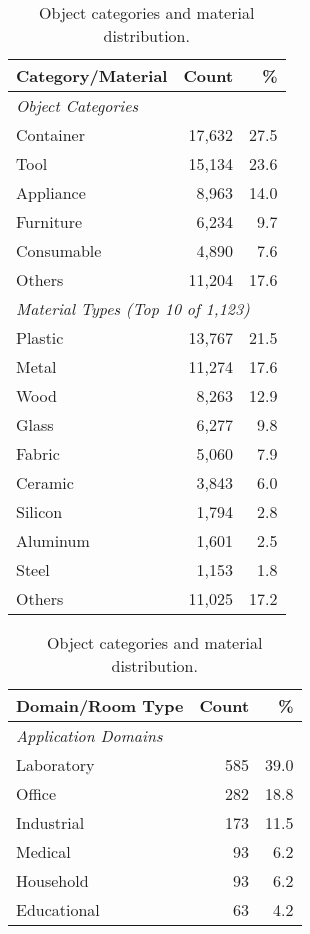 \vspace{0.3cm}

\begin{table}[htbp]
\centering
\footnotesize
\begin{minipage}[t]{0.47\textwidth}
\centering
\begin{tabular}{lrr}
\toprule
\textbf{Category/Material} & \textbf{Count} & \textbf{\%} \\
\midrule
\multicolumn{3}{l}{\textit{Object Categories}} \\
Container & 17,632 & 27.5 \\
Tool & 15,134 & 23.6 \\
Appliance & 8,963 & 14.0 \\
Furniture & 6,234 & 9.7 \\
Consumable & 4,890 & 7.6 \\
Others & 11,204 & 17.6 \\
\midrule
\multicolumn{3}{l}{\textit{Material Types (Top 10 of 1,123)}} \\
Plastic & 13,767 & 21.5 \\
Metal & 11,274 & 17.6 \\
Wood & 8,263 & 12.9 \\
Glass & 6,277 & 9.8 \\
Fabric & 5,060 & 7.9 \\
Ceramic & 3,843 & 6.0 \\
Silicon & 1,794 & 2.8 \\
Aluminum & 1,601 & 2.5 \\
Steel & 1,153 & 1.8 \\
Others & 11,025 & 17.2 \\
\bottomrule
\end{tabular}
\caption{Object categories and material distribution.}
\label{tab:object_materials}
\end{minipage}
\hfill
\begin{minipage}[t]{0.47\textwidth}
\centering
\begin{tabular}{lrr}
\toprule
\textbf{Domain/Room Type} & \textbf{Count} & \textbf{\%} \\
\midrule
\multicolumn{3}{l}{\textit{Application Domains}} \\
Laboratory & 585 & 39.0 \\
Office & 282 & 18.8 \\
Industrial & 173 & 11.5 \\
Medical & 93 & 6.2 \\
Household & 93 & 6.2 \\
Educational & 63 & 4.2 \\

\end{tabular}
\end{minipage}
\end{table}
